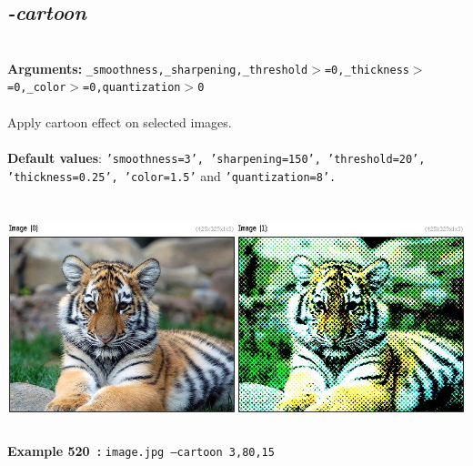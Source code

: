 \documentclass[a4paper,11pt,twoside]{book}
\begin{document}
\subsection{\emph{-cartoon} }\vspace*{-0.5em}
~\\\textbf{Arguments: } 
{\small \texttt{\_smoothness,\_sharpening,\_threshold$>$=0,\_thickness$>$=0,\_color$>$=0,quantization$>$0}}\\~\\
Apply cartoon effect on selected images.
~\\~\\\textbf{Default values}: {\small \texttt{'smoothness=3', 'sharpening=150', 'threshold=20', 'thickness=0.25', 'color=1.5'} and \texttt{'quantization=8'.}}
\begin{center}\includegraphics[keepaspectratio=true,height=7cm,width=\textwidth]{img/gmic_def520.jpg}\\
{\footnotesize \textbf{Example 520~:} \texttt{image.jpg --cartoon 3,80,15}}
\end{center}
\end{document}
